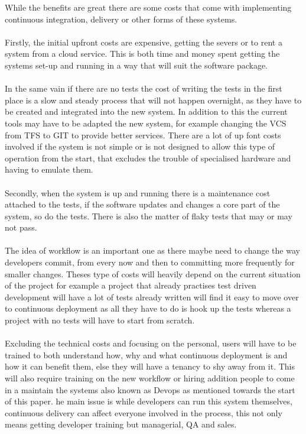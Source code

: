 While the benefits are great there are some costs that come with implementing continuous integration, delivery or other forms of these systems.
\\\\
Firstly, the initial upfront costs are expensive, getting the severs or to rent a system from a cloud service. This is both time and money spent getting the systems set-up and running in a way that will suit the software package. 
\\\\
In the same vain if there are no tests the cost of writing the tests in the first place is a slow and steady process that will not happen overnight, as they have to be created and integrated into the new system. In addition to this the current tools may have to be adapted the new system, for example changing the VCS from TFS to GIT to provide better services. There are a lot of up font costs involved if the system is not simple or is not designed to allow this type of operation from the start, that excludes the trouble of specialised hardware and having to emulate them. 
\\\\
Secondly, when the system is up and running there is a maintenance cost attached to the tests, if the software updates and changes a core part of the system, so do the tests. There is also the matter of flaky tests that may or may not pass.
\\\\
The idea of workflow is an important one as there maybe need to change the way developers commit, from every now and then to committing more frequently for smaller changes. Theses type of costs will heavily depend on the current situation of the project for example a project that already practises test driven development will have a lot of tests already written will find it easy to move over to continuous deployment as all they have to do is hook up the tests whereas a project with no tests will have to start from scratch. 
\\\\
Excluding the technical costs and focusing on the personal, users will have to be trained to both understand how, why and what continuous deployment is and how it can benefit them, else they will have a tenancy to shy away from it. This will also require training on the new workflow or hiring addition people to come in a maintain the systems also known as Devops as mentioned towards the start of this paper. he main issue is while developers can run this system themselves, continuous delivery can affect everyone involved in the process, this not only means getting developer training but managerial, QA and sales. 

